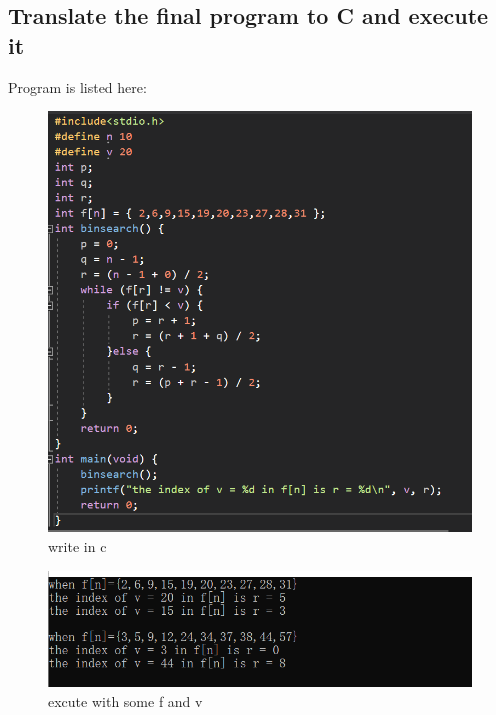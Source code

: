 \documentclass[11pt,a4paper,fleqn]{article}
\begin{document}
\subsection{Translate the final program to C and execute it}
\noindent
Program is listed here:
\begin{figure}[h!]
\centering
\includegraphics{1.png}
\caption{ write in c}
\label{fig}
\end{figure}
\begin{figure}[h!]
\centering
\includegraphics{2.png}
\caption{ excute with some f and v}
\label{fig}
\end{figure}


%
%
\end{document}
